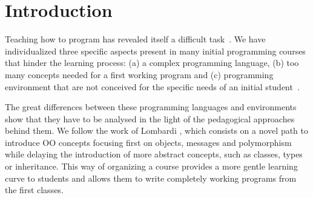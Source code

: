 \section{Introduction}
\label{sec:intro}



Teaching how to program has revealed itself a difficult task~\cite{dijkstra_89a, jenkins2002difficulty}.
We have individualized three specific aspects present in many initial programming courses that hinder the learning process: 
(a) a complex programming language,
(b) too many concepts needed for a first working program and
(c) programming environment that are not conceived for the specific needs of an initial student~\cite{singh2012}.



\medskip

The great differences between these programming languages and environments show that they have to be analysed in the light of the pedagogical approaches behind them.
We follow the work of Lombardi \etal
\cite{lombardi_instances_2007,lombardi_carlos_alumnos_2008,spigariol_lucas_ensenando_2013,passerini2017wollok}, 
which consists on a novel path to introduce OO concepts focusing first on objects, messages and polymorphism 
while delaying the introduction of more abstract concepts,
such as classes, types or inheritance.
This way of organizing a course provides a more gentle learning curve to students and allows them to write completely working programs from the first classes.

